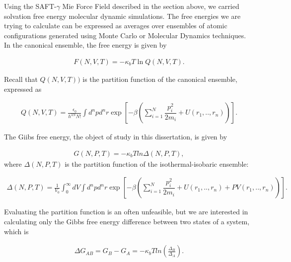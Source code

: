 	Using the SAFT-$\gamma$ Mie Force Field described in the section above, we carried solvation free energy molecular dynamic simulations. The free energies we are trying to calculate can be expressed as averages over ensembles of atomic configurations generated using Monte Carlo or Molecular Dynamics techniques. In the canonical ensemble, the free energy is given by  
	
	\begin{equation}
	\label{eq:fcano}
	\begin{aligned}
	F(N,V,T) = -\kappa_{b}T \ln Q(N,V,T).
	\end{aligned}
	\end{equation}
	
	Recall that $Q(N,V,T))$ is the partition function of the canonical ensemble, expressed as
	
	\begin{equation}
	\label{eq:partican}
	\begin{aligned}
	Q(N,V,T) =\frac{\epsilon_{0}}{h^{3N}N!} \int d^{n}p d^{n}r \exp \left[ -\beta \left( \sum_{i=1}^{N}\dfrac{p_{i}^{2}}{2m_{i}} + U(r_{1},..,r_{n}) \right)
	\right] .
	\end{aligned}
	\end{equation}
	
	The Giibs free energy, the object of study in this dissertation, is given by
	
	\begin{equation}
	\label{eq:fisobari}
	\begin{aligned}
	G(N,P,T) = -\kappa_{b}T ln \Delta (N,P,T),
	\end{aligned}
	\end{equation}
	where $\Delta (N,P,T)$ is the partition function of the isothermal-isobaric ensemble:
	
	\begin{equation}
	\label{eq:partiso}
	\begin{aligned}
	\Delta (N,P,T) = \frac{1}{V_{0}} \int_{0}^{\infty} dV \int d^{n}p d^{n}r \exp \left[ -\beta \left( \sum_{i=1}^{N}\dfrac{p_{i}^{2}}{2m_{i}} + U(r_{1},..,r_{n}) + PV(r_{1},..,r_{n}) \right) \right].
	\end{aligned}
	\end{equation}
	
	Evaluating the partition function is an often unfeasible, but we are interested in calculating only the Gibbs free energy difference between two states of a system, which is  
	
	\begin{equation}
	\label{eq:dif}
	\begin{aligned}
	\Delta G_{AB} = G_{B} - G_{A}= -\kappa_{b}T ln \left( \frac{\Delta_{B}}{\Delta_{A}}\right) .
	\end{aligned}
	\end{equation}
	
